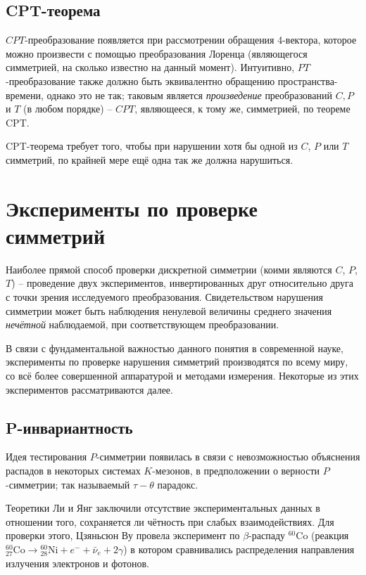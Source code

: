 \documentclass[14pt]{extarticle}
\begin{document}
\subsection{CPT-теорема} 

$CPT$-преобразование появляется при рассмотрении обращения 4-вектора, которое можно произвести с помощью преобразования Лоренца (являющегося симметрией, на сколько известно на данный момент). Интуитивно, $PT$-преобразование также должно быть эквивалентно обращению пространства-времени, однако это не так; таковым является \emph{произведение} преобразований $C, P$ и $T$ (в любом порядке) -- $CPT$, являющееся, к тому же, симметрией, по теореме CPT. 

CPT-теорема требует того, чтобы при нарушении хотя бы одной из $C$, $P$ или $T$ симметрий, по крайней мере ещё одна так же должна нарушиться. 


\section{Эксперименты по проверке симметрий}

Наиболее прямой способ проверки дискретной симметрии (коими являются $C$, $P$, $T$) -- проведение двух экспериментов, инвертированных друг относительно друга с точки зрения исследуемого преобразования.
%
Свидетельством нарушения симметрии может быть наблюдения ненулевой величины среднего значения \emph{нечётной} наблюдаемой, при соответствующем преобразовании.~\cite[стр. 12]{Symmetries}

В связи с фундаментальной важностью данного понятия в современной науке, эксперименты по проверке нарушения симметрий производятся по всему миру, со всё более совершенной аппаратурой и методами измерения. Некоторые из этих экспериментов рассматриваются далее.

\subsection{P-инвариантность}

Идея тестирования $P$-симметрии появилась в связи с невозможностью объяснения распадов в некоторых системах $K$-мезонов, в предположении о верности $P$-симметрии; так называемый $\tau-\theta$ парадокс.~\cite[стр. 43]{Symmetries}

Теоретики Ли и Янг заключили отсутствие экспериментальных данных в отношении того, сохраняется ли чётность при слабых взаимодействиях.\cite{Lee&Yang} Для проверки этого, Цзяньсюн Ву провела эксперимент по $\beta$-распаду $^{60}\mathrm{Co}$ (реакция ${^{60}_{27}\mathrm{Co}}\to {^{60}_{28}\mathrm{Ni}} + e^- + \bar{\nu}_e + 2\gamma $) в котором сравнивались распределения направления излучения электронов и фотонов.\cite{Wu}
\end{document}
